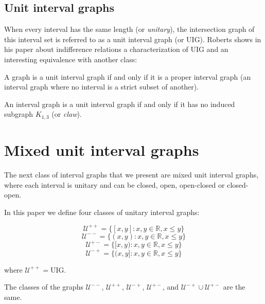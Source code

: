 \subsection{Unit interval graphs}
When every interval has the same length (or \emph{unitary}), the intersection graph of this interval set is referred to as a unit interval graph (or UIG).
Roberts \cite{roberts1968representations} shows in his paper about indifference relations a characterization of UIG and an interesting equivalence with another class:

\begin{theorem}
  A graph is a unit interval graph if and only if it is a proper interval graph (an interval graph where no interval is a strict subset of another).
\end{theorem}

\begin{theorem}
  \label{theo:k_13}
  An interval graph is a unit interval graph if and only if it has no induced subgraph $K_{1,3}$ (or \emph{claw}).
\end{theorem}

\section{Mixed unit interval graphs}
\label{sec:muig}

The next class of interval graphs that we present are mixed unit interval graphs, where each
interval is unitary and can be closed, open, open-closed or closed-open.

In this paper we define four classes of unitary interval graphs:

$$\mathcal{U}^{++} = \{[x,y] : x,y \in \mathbb{R}, x\leq y\}$$
$$\mathcal{U}^{--} = \{(x,y) : x,y \in \mathbb{R}, x\leq y\}$$
$$\mathcal{U}^{+-} = \{[x,y) : x,y \in \mathbb{R}, x\leq y\}$$
$$\mathcal{U}^{-+} = \{(x,y] : x,y \in \mathbb{R}, x\leq y\}$$

where $\mathcal{U}^{++} = \text{UIG}$.
\begin{theorem}
  The classes of the graphs $\mathcal{U}^{--}$, $\mathcal{U}^{++}$,
  $\mathcal{U}^{-+}$, $\mathcal{U}^{+-}$, and  $\mathcal{U}^{-+} \cup
  \mathcal{U}^{+-}$ are the same.
\end{theorem}

